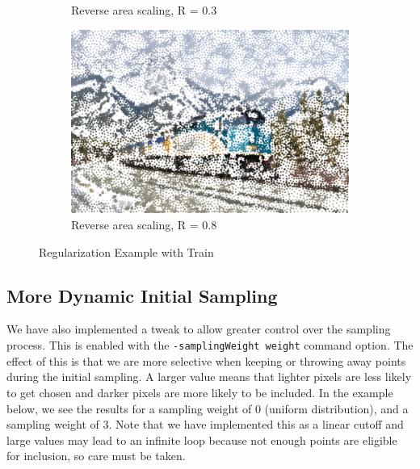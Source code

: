 \documentclass[11pt]{article}
\begin{document}
\begin{figure}[H]
\begin{subfigure}[b]{.48\linewidth}
		\caption{Reverse area scaling, R = 0.3}
		\label{fig:train2}
	\end{subfigure}
		\begin{subfigure}[b]{.48\linewidth}
		\includegraphics[width=\linewidth]{Train-Canada-8000-3}
		\caption{Reverse area scaling, R = 0.8}
		\label{fig:train3}
	\end{subfigure}
	\caption{Regularization Example with Train}
	\label{fig:mountRusddhmoreEx}
\end{figure}

\subsection{More Dynamic Initial Sampling}

We have also  implemented a tweak to allow greater control over the sampling process. This is enabled with the \verb|-samplingWeight weight| command option. The effect of this is that we are more selective when keeping or throwing away points during the initial sampling. A larger value means that lighter pixels are less likely to get chosen and darker pixels are more likely to be included. In the example below, we see the results for a sampling weight of 0 (uniform distribution), and a sampling weight of 3. Note that we have implemented this as a linear cutoff and large values may lead to an infinite loop because not enough points are eligible for inclusion, so care must be taken.
\end{document}
